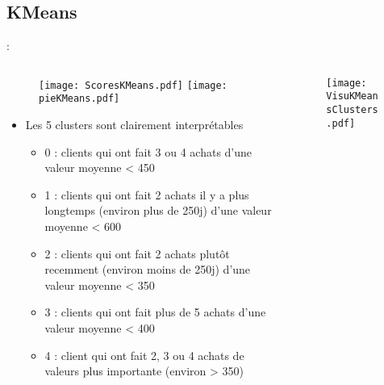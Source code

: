 \documentclass[8pt,aspectratio=169,hyperref={unicode=true}]{beamer}
\begin{document}
\subsection{KMeans}
\begin{frame}{\insertsection: \insertsubsection}
    \begin{columns}
        \begin{column}{.55\textwidth}
            \begin{figure}
                \texttt{[image: ScoresKMeans.pdf]}
                \texttt{[image: pieKMeans.pdf]}
            \end{figure}
            \begin{itemize}
                \item Les 5 clusters sont clairement interprétables
                \begin{itemize}
                    \item 0 : clients qui ont fait 3 ou 4 achats d'une valeur moyenne < 450
                    \item 1 : clients qui ont fait 2 achats il y a plus longtemps (environ plus de 250j) d'une valeur moyenne < 600
                    \item 2 : clients qui ont fait 2 achats plutôt recemment (environ moins de 250j) d'une valeur moyenne < 350
                    \item 3 : clients qui ont fait plus de 5 achats d'une valeur moyenne < 400
                    \item 4 : client qui ont fait 2, 3 ou 4 achats de valeurs plus importante (environ > 350)
                \end{itemize}
            \end{itemize}
        \end{column}
        \begin{column}{.45\textwidth}
            \begin{figure}
                \texttt{[image: VisuKMeansClusters.pdf]}
            \end{figure}
        \end{column}
    \end{columns}
\end{frame}
\end{document}

